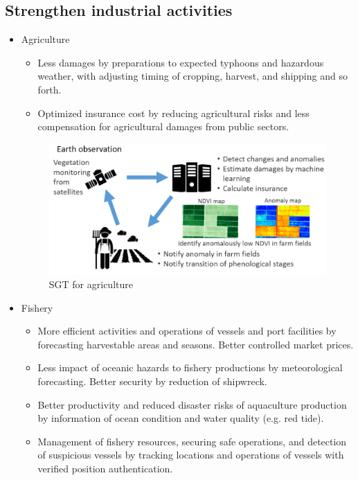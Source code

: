 \subsection{Strengthen industrial activities}

\begin{itemize}

\item Agriculture

\begin{itemize}
\item Less damages by preparations to expected typhoons and hazardous weather, with adjusting timing of cropping, harvest, and shipping and so forth.
\item Optimized insurance cost by reducing agricultural risks and less compensation for agricultural damages from public sectors.
\end{itemize}

\begin{figure}[H]
\begin{center}
\includegraphics[width = 0.8\linewidth]{Figures/agri_anomaly.png}
\end{center}
\caption{SGT for agriculture}
\label{bangladesh}
\end{figure}

\item Fishery

\begin{itemize}
\item More efficient activities and operations of vessels and port facilities by forecasting harvestable areas and seasons. Better controlled market prices.
\item Less impact of oceanic hazards to fishery productions by meteorological forecasting. Better security by reduction of shipwreck. 
\item Better productivity and reduced disaster risks of aquaculture production by information of ocean condition and water quality (e.g. red tide).
\item Management of fishery resources, securing safe operations, and detection of suspicious vessels by tracking locations and operations of vessels with verified position authentication.
\end{itemize}


\end{itemize}
